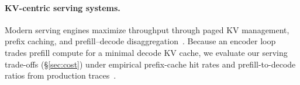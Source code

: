 \paragraph{KV-centric serving systems.} 
Modern serving engines maximize throughput through paged KV management, prefix caching, and prefill--decode disaggregation~\citep{vllm,sglang,mooncake,distserve,splitwise}. Because an encoder loop trades prefill compute for a minimal decode KV cache, we evaluate our serving trade-offs (\S\ref{sec:cost}) under empirical prefix-cache hit rates and prefill-to-decode ratios from production traces~\citep{prefixcache_wild,mooncake,agentic_coding_wild}.
